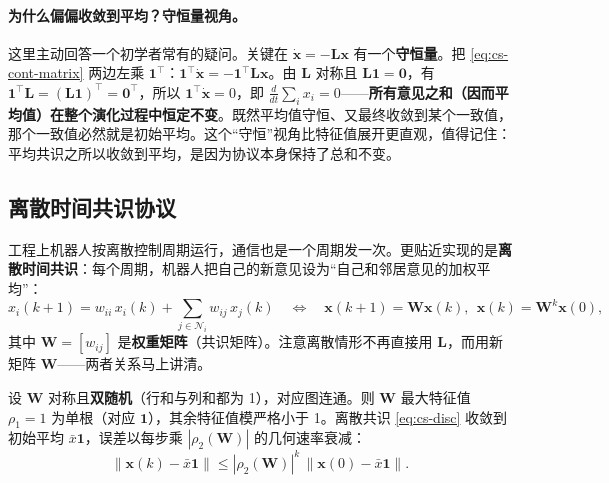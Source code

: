 \paragraph{为什么偏偏收敛到平均？守恒量视角。}
这里主动回答一个初学者常有的疑问。关键在 $\dot{\mathbf{x}}=-\mathbf{L}\mathbf{x}$ 有一个\textbf{守恒量}。把 \cref{eq:cs-cont-matrix} 两边左乘 $\mathbf{1}^\top$：$\mathbf{1}^\top\dot{\mathbf{x}}=-\mathbf{1}^\top\mathbf{L}\mathbf{x}$。由 $\mathbf{L}$ 对称且 $\mathbf{L}\mathbf{1}=\mathbf{0}$，有 $\mathbf{1}^\top\mathbf{L}=(\mathbf{L}\mathbf{1})^\top=\mathbf{0}^\top$，所以 $\mathbf{1}^\top\dot{\mathbf{x}}=0$，即 $\tfrac{d}{dt}\sum_i x_i=0$——\textbf{所有意见之和（因而平均值）在整个演化过程中恒定不变}。既然平均值守恒、又最终收敛到某个一致值，那个一致值必然就是初始平均。这个“守恒”视角比特征值展开更直观，值得记住：平均共识之所以收敛到平均，是因为协议本身保持了总和不变。

\subsection{离散时间共识协议}
\label{sec:cs-disc}

工程上机器人按离散控制周期运行，通信也是一个周期发一次。更贴近实现的是\textbf{离散时间共识}：每个周期，机器人把自己的新意见设为“自己和邻居意见的加权平均”：
\begin{equation}
  x_i(k{+}1) = w_{ii}\,x_i(k) + \sum_{j\in\mathcal{N}_i} w_{ij}\,x_j(k)\quad\Longleftrightarrow\quad \mathbf{x}(k{+}1)=\mathbf{W}\mathbf{x}(k),\ \ \mathbf{x}(k)=\mathbf{W}^k\mathbf{x}(0),
  \label{eq:cs-disc}
\end{equation}
其中 $\mathbf{W}=[w_{ij}]$ 是\textbf{权重矩阵}（共识矩阵）。注意离散情形不再直接用 $\mathbf{L}$，而用新矩阵 $\mathbf{W}$——两者关系马上讲清。

\begin{theorem}\label{thm:cs-disc-conv}
设 $\mathbf{W}$ 对称且\textbf{双随机}（行和与列和都为 1），对应图连通。则 $\mathbf{W}$ 最大特征值 $\rho_1=1$ 为单根（对应 $\mathbf{1}$），其余特征值模严格小于 1。离散共识 \cref{eq:cs-disc} 收敛到初始平均 $\bar x\mathbf{1}$，误差以每步乘 $|\rho_2(\mathbf{W})|$ 的几何速率衰减：
\begin{equation}
  \|\mathbf{x}(k)-\bar x\mathbf{1}\| \le |\rho_2(\mathbf{W})|^k\,\|\mathbf{x}(0)-\bar x\mathbf{1}\|.
  \label{eq:cs-disc-bound}
\end{equation}
\end{theorem}

